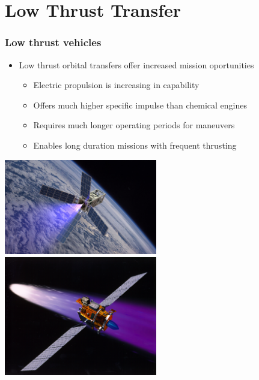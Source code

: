 
\section{Low Thrust Transfer}

\begin{frame} \label{slide:lowthrust_vehicles}%
\frametitle{Low thrust vehicles} %
\begin{itemize}
    \item Low thrust orbital transfers offer increased mission oportunities
    \begin{itemize}
        \item Electric propulsion is increasing in capability
        \item Offers much higher specific impulse than chemical engines 
        \item Requires much longer operating periods for maneuvers 
        \item Enables long duration missions with frequent thrusting
    \end{itemize}
\end{itemize}

\begin{center}
    \includegraphics[height=0.4\textheight,width=0.5\textwidth,keepaspectratio]{figures/defense/patriot_plume.jpg}
    ~
    \includegraphics[height=0.4\textheight,width=0.5\textwidth,keepaspectratio]{figures/defense/deepspace1.jpg}
\end{center}
\hyperlink{slide:propulsion}{}
\end{frame}   %

